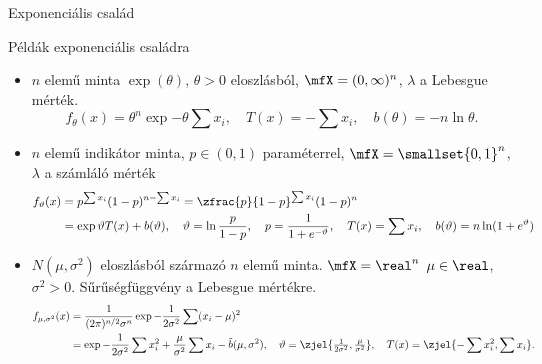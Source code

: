 \documentclass[aspectratio=169,notheorems,9pt,\option]{beamer}
\begin{document}
\begin{frame}{Exponenciális család}
\begin{itemize}
  \end{itemize}
\end{frame}

\begin{frame}{Példák exponenciális családra}
  \begin{itemize}
    \item $n$ elemű minta $\exp(\theta)$, $\theta>0$ eloszlásból, $\mfX=(0,\infty)^n$, $\lambda$ a Lebesgue mérték.
    \begin{displaymath}
      f_\theta(x) = \theta^n\exp{-\theta\sum x_i},\quad T(x)=-\sum x_i,\quad b(\theta)=-n\ln\theta.
    \end{displaymath}
    \item $n$ elemű indikátor minta, $p\in(0,1)$ paraméterrel, $\mfX=\smallset{0,1}^n$, 
     $\lambda$ a számláló mérték
    \begin{align*}
      f_\theta(x)&=p^{\sum x_i}(1-p)^{n-\sum x_i}=\zfrac{p}{1-p}^{\sum x_i} (1-p)^n\\
      &=\exp{\theta T(x) +b(\theta)},\quad \theta=\ln\frac{p}{1-p}, \quad p =\frac{1}{1+e^{-\theta}},\quad 
      T(x)=\sum x_i,\quad 
      b(\theta)= n\ln(1+e^{\theta})
    \end{align*}
    \item $N(\mu,\sigma^2)$ eloszlásból származó $n$ elemű minta. $\mfX=\real^n$ $\mu\in\real$, $\sigma^2>0$. 
    Sűrűségfüggvény a Lebesgue mértékre.
    \begin{align*}
      f_{\mu,\sigma^2}(x)&=\frac{1}{(2\pi)^{n/2}\sigma^n}\exp{-\frac1{2\sigma^2}\sum(x_i-\mu)^2}\\
      &=\exp{-\frac{1}{2\sigma^2}\sum x_i^2+\frac{\mu}{\sigma^2}\sum x_i -\tilde b(\mu,\sigma^2)},
      \quad \theta=\zjel{\tfrac1{2\sigma^2},\tfrac\mu{\sigma^2}}, \quad T(x)=\zjel{-\sum x_i^2,\sum x_i}.
    \end{align*}
  \end{itemize}
\end{frame}
\end{document}

